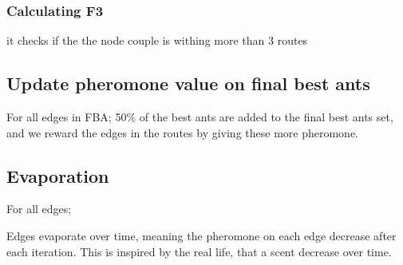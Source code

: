 \subsubsection{Calculating F3}
it checks if the the node couple is withing more than 3 routes


\subsection{Update pheromone value on final best ants}

For all edges in FBA;
50\% of the best ants are added to the final best ants set, and we reward the edges in the routes by giving these more pheromone.

\subsection{Evaporation}

For all edges;

Edges evaporate over time, meaning the pheromone on each edge decrease after each iteration. This is inspired by the real life, that a scent decrease over time.





